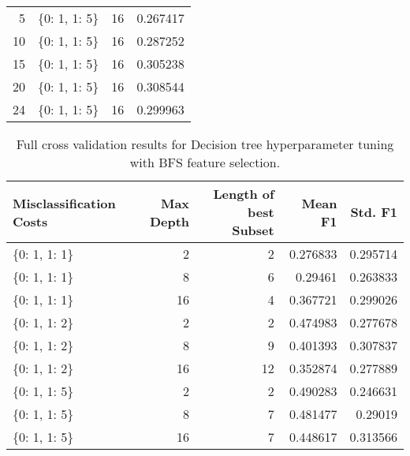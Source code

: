 \documentclass{article}
\begin{document}
\begin{table}[H]
\begin{tabular}{rlrr}
              5 & \{0: 1, 1: 5\}              &          16 &               0.267417  \\
             10 & \{0: 1, 1: 5\}              &          16 &               0.287252  \\
             15 & \{0: 1, 1: 5\}              &          16 &               0.305238  \\
             20 & \{0: 1, 1: 5\}              &          16 &               0.308544  \\
             24 & \{0: 1, 1: 5\}              &          16 &               0.299963  \\
\hline
\end{tabular}
\end{table}

\begin{table}[H]
\centering
\caption{Full cross validation results for Decision tree hyperparameter tuning with BFS feature selection.}
\label{tab:dtree-bfs-full}
\begin{tabular}{lrrrr}
\hline
 Misclassification Costs   &   Max Depth &   Length of best Subset &   Mean F1 &   Std. F1 \\
\hline
 \{0: 1, 1: 1\}              &           2 &                       2 &  0.276833 &  0.295714 \\
 \{0: 1, 1: 1\}              &           8 &                       6 &  0.29461  &  0.263833 \\
 \{0: 1, 1: 1\}              &          16 &                       4 &  0.367721 &  0.299026 \\
 \{0: 1, 1: 2\}              &           2 &                       2 &  0.474983 &  0.277678 \\
 \{0: 1, 1: 2\}              &           8 &                       9 &  0.401393 &  0.307837 \\
 \{0: 1, 1: 2\}              &          16 &                      12 &  0.352874 &  0.277889 \\
 \{0: 1, 1: 5\}              &           2 &                       2 &  0.490283 &  0.246631 \\
 \{0: 1, 1: 5\}              &           8 &                       7 &  0.481477 &  0.29019  \\
 \{0: 1, 1: 5\}              &          16 &                       7 &  0.448617 &  0.313566 \\
\hline
\end{tabular}
\end{table}
\end{document}
